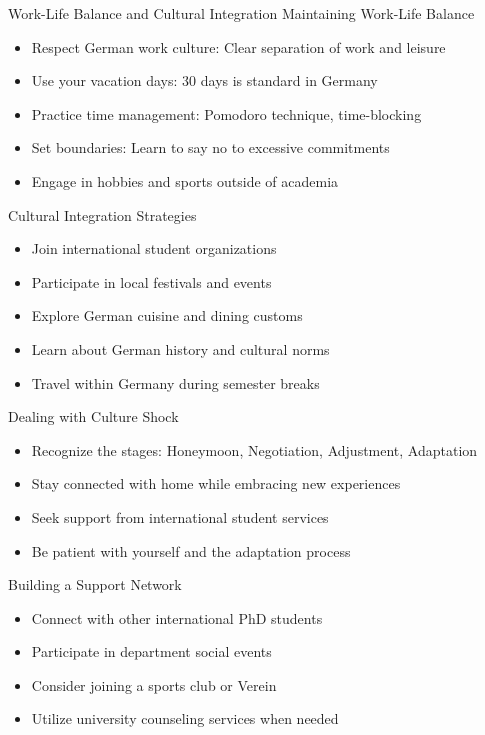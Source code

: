 \documentclass[aspectratio=169,10pt]{beamer}
\begin{document}
\begin{frame}{Work-Life Balance and Cultural Integration}
\alert{Maintaining Work-Life Balance}
\begin{itemize}
    \item Respect German work culture: Clear separation of work and leisure
    \item Use your vacation days: 30 days is standard in Germany
    \item Practice time management: Pomodoro technique, time-blocking
    \item Set boundaries: Learn to say no to excessive commitments
    \item Engage in hobbies and sports outside of academia
\end{itemize}

\alert{Cultural Integration Strategies}
\begin{itemize}
    \item Join international student organizations
    \item Participate in local festivals and events
    \item Explore German cuisine and dining customs
    \item Learn about German history and cultural norms
    \item Travel within Germany during semester breaks
\end{itemize}

\alert{Dealing with Culture Shock}
\begin{itemize}
    \item Recognize the stages: Honeymoon, Negotiation, Adjustment, Adaptation
    \item Stay connected with home while embracing new experiences
    \item Seek support from international student services
    \item Be patient with yourself and the adaptation process
\end{itemize}

\alert{Building a Support Network}
\begin{itemize}
    \item Connect with other international PhD students
    \item Participate in department social events
    \item Consider joining a sports club or Verein
    \item Utilize university counseling services when needed
\end{itemize}
\end{frame}
\end{document}
